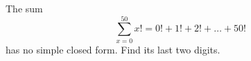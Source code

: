 The sum
\[
\sum_{x=0}^{50}x!=0!+1!+2!+\dots+50!
\]
has no simple closed form. Find its last two digits.
